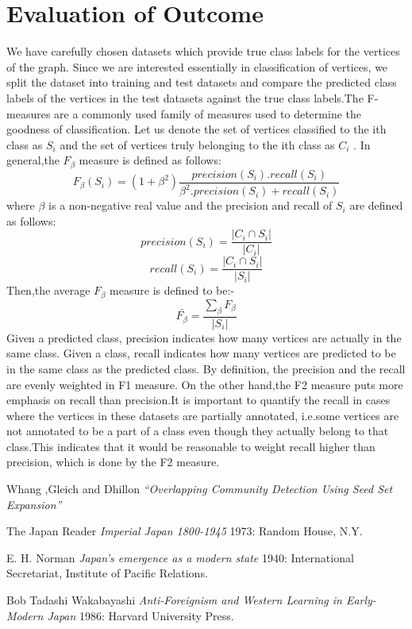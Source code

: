 \documentclass{article}
\begin{document}
\section*{Evaluation of Outcome}
We have carefully chosen datasets which provide true class labels for the vertices of the graph. Since we are interested essentially in classification of vertices, we split the dataset into training and test datasets and compare the predicted class labels of the vertices in the test datasets against the true class labels.The F-measures are a commonly used family of measures used to determine the goodness of classification. Let us denote the set of vertices classified to the ith class as $S_i$ and the set of vertices truly belonging to the ith class as $C_i$ . In general,the $F_{\beta}$ measure is defined as follows:
\begin{equation}
F_{\beta}(S_{i}) = (1+{\beta^2}) \frac{precision(S_{i}).recall(S_{i})}{{\beta^2}.precision(S_{i})+recall(S_{i})}
\end{equation}
where $\beta$ is a non-negative real value and the precision and recall of $S_i$ are defined as follows:
\begin{equation}
precision({S_{i}}) = \frac{ \left|{{C_{i}} \cap {S_{i}}}\right| }{ \left|{C_{i}}\right| } 
\end{equation} 
\begin{equation}
recall({S_{i}}) = \frac{ \left|{{C_{i}} \cap {S_{i}}}\right| }{ \left| {S_{i}} \right| } 
\end{equation} 
Then,the average $F_{\beta}$ measure is defined to be:-
\begin{equation}
\bar{F_{\beta}} = \frac{\sum_{\beta}{F_{\beta}}}{ \left|{S_{i}}\right| }
\end{equation}
Given a predicted class, precision indicates how many vertices are actually in the same class. Given a class, recall indicates how many vertices are predicted to be in the same class as the predicted class. By definition, the precision and the recall are evenly weighted in F1 measure. On the other hand,the F2 measure puts more emphasis on recall than precision.It is important to quantify the recall in cases where the vertices in these datasets are partially annotated, i.e.some vertices are not annotated to be a part of a class even though they actually belong to that class.This indicates that it would be reasonable to weight recall higher than precision, which is done by the F2 measure.


\begin{thebibliography}{1}
 Whang ,Gleich and Dhillon {\em ``Overlapping Community Detection
Using Seed Set Expansion''} 

  The Japan Reader {\em Imperial Japan 1800-1945} 1973:
  Random House, N.Y.

 E. H. Norman {\em Japan's emergence as a modern
  state} 1940: International Secretariat, Institute of Pacific
  Relations.

 Bob Tadashi Wakabayashi {\em Anti-Foreignism and Western
  Learning in Early-Modern Japan} 1986: Harvard University Press.
\end{thebibliography}
\end{document}

